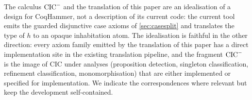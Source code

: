The calculus $\mathrm{CIC}^{-}$ and the translation of this paper are an idealisation
of a design for CoqHammer, not a description of its current code: the
current tool emits the guarded disjunctive case axioms of
\cref{sec:casesplit} and translates the type of $h$ to an opaque
inhabitation atom.  The idealisation is faithful in the other direction:
every axiom family emitted by the translation of this paper has a direct
implementation site in the existing translation pipeline, and the fragment
$\mathrm{CIC}^{-}$ is the image of CIC under analyses (proposition detection,
singleton classification, refinement classification, monomorphisation)
that are either implemented or specified for implementation.  We indicate
the correspondences where relevant but keep the development self-contained.
